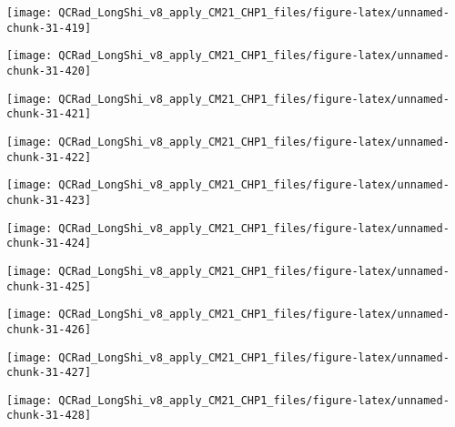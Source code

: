 \documentclass[
  10pt,
  a4paper,oneside]{article}
\begin{document}
\begin{center}\texttt{[image: QCRad\_LongShi\_v8\_apply\_CM21\_CHP1\_files/figure-latex/unnamed-chunk-31-419]} \end{center}

\begin{center}\texttt{[image: QCRad\_LongShi\_v8\_apply\_CM21\_CHP1\_files/figure-latex/unnamed-chunk-31-420]} \end{center}

\begin{center}\texttt{[image: QCRad\_LongShi\_v8\_apply\_CM21\_CHP1\_files/figure-latex/unnamed-chunk-31-421]} \end{center}

\begin{center}\texttt{[image: QCRad\_LongShi\_v8\_apply\_CM21\_CHP1\_files/figure-latex/unnamed-chunk-31-422]} \end{center}

\begin{center}\texttt{[image: QCRad\_LongShi\_v8\_apply\_CM21\_CHP1\_files/figure-latex/unnamed-chunk-31-423]} \end{center}

\begin{center}\texttt{[image: QCRad\_LongShi\_v8\_apply\_CM21\_CHP1\_files/figure-latex/unnamed-chunk-31-424]} \end{center}

\begin{center}\texttt{[image: QCRad\_LongShi\_v8\_apply\_CM21\_CHP1\_files/figure-latex/unnamed-chunk-31-425]} \end{center}

\begin{center}\texttt{[image: QCRad\_LongShi\_v8\_apply\_CM21\_CHP1\_files/figure-latex/unnamed-chunk-31-426]} \end{center}

\begin{center}\texttt{[image: QCRad\_LongShi\_v8\_apply\_CM21\_CHP1\_files/figure-latex/unnamed-chunk-31-427]} \end{center}

\begin{center}\texttt{[image: QCRad\_LongShi\_v8\_apply\_CM21\_CHP1\_files/figure-latex/unnamed-chunk-31-428]} \end{center}
\end{document}
